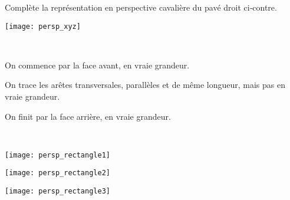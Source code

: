 \begin{methode*1}

 \begin{exemple*1}
 
 \begin{minipage}[c]{0.62\linewidth}
 Complète la représentation en perspective cavalière du pavé droit ci‑contre.
  \end{minipage} \hfill%
  \begin{minipage}[c]{0.32\linewidth} 
   \texttt{[image: persp\_xyz]}
   \end{minipage} \\[1.4em]
   
 \begin{minipage}[t]{0.3\linewidth}   
On commence par la face avant, en vraie grandeur.
  \end{minipage} \hfill%
  \begin{minipage}[t]{0.3\linewidth}
On trace les arêtes transversales, parallèles et de même longueur, mais pas en vraie grandeur.
  \end{minipage} \hfill%
   \begin{minipage}[t]{0.3\linewidth}   
On finit par la face arrière, en vraie grandeur.
   \end{minipage} \\
   
 \begin{minipage}[c]{0.3\linewidth}     
\begin{center} \texttt{[image: persp\_rectangle1]} \end{center}
  \end{minipage} \hfill%
  \begin{minipage}[c]{0.3\linewidth}
\begin{center} \texttt{[image: persp\_rectangle2]} \end{center}
  \end{minipage} \hfill%
   \begin{minipage}[c]{0.3\linewidth}   
\begin{center} \texttt{[image: persp\_rectangle3]} \end{center}
   \end{minipage} \\
 \end{exemple*1}


\end{methode*1}
